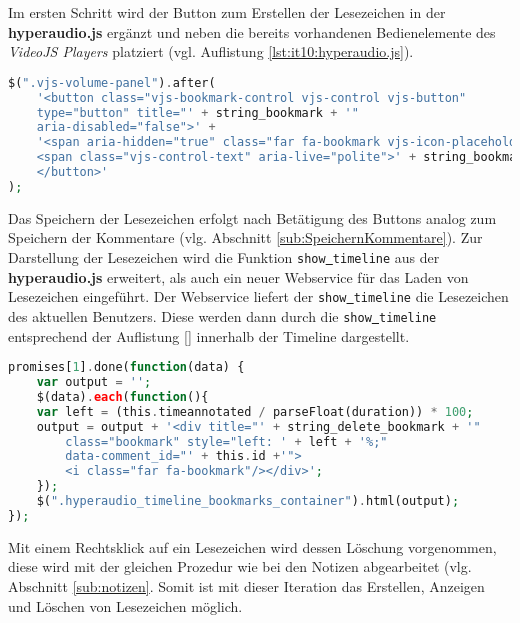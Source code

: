 Im ersten Schritt wird der Button zum Erstellen der Lesezeichen in der \textbf{hyperaudio.js} ergänzt und neben die bereits vorhandenen Bedienelemente des \textit{VideoJS Players} platziert (vgl. Auflistung \ref{lst:it10:hyperaudio.js}).

\begin{lstlisting}[language=php,
             linewidth=\textwidth,
             caption={Ausschnitt der \textbf{hyperaudio.js} in der 10. Iteration},
             label={lst:it10:hyperaudio.js}]
$(".vjs-volume-panel").after(
    '<button class="vjs-bookmark-control vjs-control vjs-button"
    type="button" title="' + string_bookmark + '"
    aria-disabled="false">' +
    '<span aria-hidden="true" class="far fa-bookmark vjs-icon-placeholder"></span>
    <span class="vjs-control-text" aria-live="polite">' + string_bookmark + '</span>
    </button>'
);
\end{lstlisting}

Das Speichern der Lesezeichen erfolgt nach Betätigung des Buttons analog zum Speichern der Kommentare (vlg. Abschnitt \ref{sub:SpeichernKommentare}). Zur Darstellung der Lesezeichen wird die Funktion \texttt{show\underline{{ }}timeline} aus der \textbf{hyperaudio.js} erweitert, als auch ein neuer Webservice für das Laden von Lesezeichen eingeführt. Der Webservice liefert der \texttt{show\underline{{ }}timeline} die Lesezeichen des aktuellen Benutzers. Diese werden dann durch die \texttt{show\underline{{ }}timeline} entsprechend der Auflistung \ref{} innerhalb der Timeline dargestellt.
\begin{lstlisting}[language=php,
             linewidth=\textwidth,
             caption={Ausschnitt der \textbf{hyperaudio.js} in der 10. Iteration},
             label={lst:it10:hyperaudio.js}]
promises[1].done(function(data) {
    var output = '';
    $(data).each(function(){
    var left = (this.timeannotated / parseFloat(duration)) * 100;
    output = output + '<div title="' + string_delete_bookmark + '" 
        class="bookmark" style="left: ' + left + '%;" 
        data-comment_id="' + this.id +'">
        <i class="far fa-bookmark"/></div>';
    });
    $(".hyperaudio_timeline_bookmarks_container").html(output);
});
\end{lstlisting}

Mit einem Rechtsklick auf ein Lesezeichen wird dessen Löschung vorgenommen, diese wird mit der gleichen Prozedur wie bei den Notizen abgearbeitet (vlg. Abschnitt \ref{sub:notizen}. Somit ist mit dieser Iteration das Erstellen, Anzeigen und Löschen von Lesezeichen möglich.

